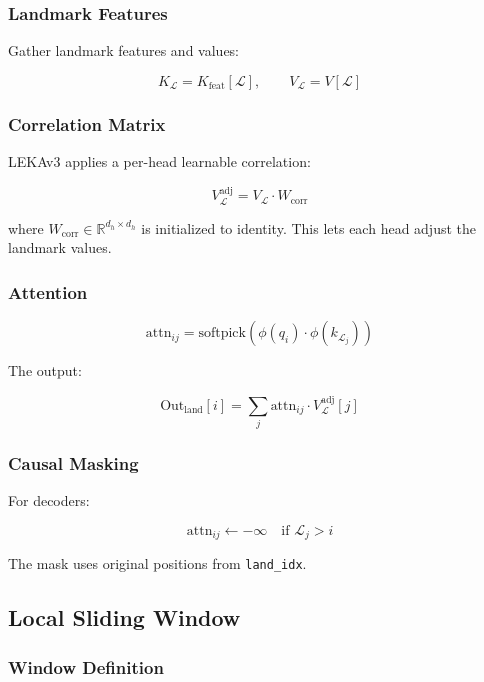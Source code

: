 \subsubsection{Landmark Features}

Gather landmark features and values:

\[
K_\mathcal{L} = K_\text{feat}[\mathcal{L}], \qquad V_\mathcal{L} = V[\mathcal{L}]
\tag{4.7}
\]

\subsubsection{Correlation Matrix}

LEKAv3 applies a per-head learnable correlation:

\[
V_\mathcal{L}^\text{adj} = V_\mathcal{L} \cdot W_\text{corr}
\tag{4.8}
\]

where $W_\text{corr} \in \mathbb{R}^{d_h \times d_h}$ is initialized to 
identity. This lets each head adjust the landmark values.

\subsubsection{Attention}

\[
\text{attn}_{ij} = \text{softpick}\!\left(\phi(q_i) \cdot \phi(k_{\mathcal{L}_j})\right)
\tag{4.9}
\]

The output:

\[
\text{Out}_\text{land}[i] = \sum_j \text{attn}_{ij} \cdot V_\mathcal{L}^\text{adj}[j]
\tag{4.10}
\]

\subsubsection{Causal Masking}

For decoders:

\[
\text{attn}_{ij} \leftarrow -\infty \quad \text{if } \mathcal{L}_j > i
\tag{4.11}
\]

The mask uses original positions from \texttt{land\_idx}.

\subsection{Local Sliding Window}

\subsubsection{Window Definition}

